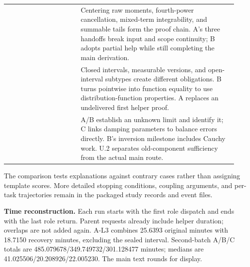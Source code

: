 \begin{longtable}{>{\raggedright\arraybackslash}p{0.3\linewidth}>{\raggedright\arraybackslash}p{0.64\linewidth}}
{M2} & {Centering raw moments, fourth-power cancellation, mixed-term integrability, and summable tails form the proof chain. A's three handoffs break input and scope continuity; B adopts partial help while still completing the main derivation.}\\
{M3} & {Closed intervals, measurable versions, and open-interval subtypes create different obligations. B turns pointwise into function equality to use distribution-function properties. A replaces an undelivered first helper proof.}\\
{H1} & {A/B establish an unknown limit and identify it; C links damping parameters to balance errors directly. B's inversion milestone includes Cauchy work. U.2 separates old-component sufficiency from the actual main route.}\\
\end{longtable}\endgroup
The comparison tests explanations against contrary cases rather than assigning template scores. More detailed stopping conditions, coupling arguments, and per-task trajectories remain in the packaged study records and event files.

\textbf{Time reconstruction.} Each run starts with the first role dispatch and ends with the last role return. Parent requests already include helper duration; overlaps are not added again. A-L3 combines 25.6393 original minutes with 18.7150 recovery minutes, excluding the sealed interval. Second-batch A/B/C totals are 485.079678/349.749732/301.128477 minutes; medians are 41.025506/20.208926/22.005230. The main text rounds for display.

